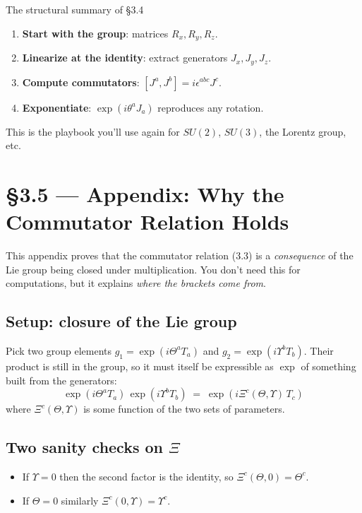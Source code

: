 \documentclass[11pt]{article}
\begin{document}
\begin{intuitionbox}{The structural summary of \S3.4}
\begin{enumerate}[leftmargin=1.5em, itemsep=2pt]
  \item \textbf{Start with the group}: matrices $R_x, R_y, R_z$.
  \item \textbf{Linearize at the identity}: extract generators $J_x, J_y, J_z$.
  \item \textbf{Compute commutators}: $[J^a, J^b] = i\epsilon^{abc}J^c$.
  \item \textbf{Exponentiate}: $\exp(i\theta^a J_a)$ reproduces any
    rotation.
\end{enumerate}
This is the playbook you'll use again for $SU(2)$, $SU(3)$, the Lorentz
group, etc.
\end{intuitionbox}

\section{\S3.5 --- Appendix: Why the Commutator Relation Holds}

This appendix proves that the commutator relation (3.3) is a
\emph{consequence} of the Lie group being closed under multiplication.
You don't need this for computations, but it explains \emph{where the
brackets come from}.

\subsection*{Setup: closure of the Lie group}

Pick two group elements $g_1 = \exp(i\Theta^a T_a)$ and $g_2 =
\exp(i\Upsilon^b T_b)$. Their product is still in the group, so it must
itself be expressible as $\exp$ of something built from the generators:
\begin{equation}
  \exp(i\Theta^a T_a)\, \exp(i\Upsilon^b T_b)
  \;=\;
  \exp(i\Xi^c(\Theta,\Upsilon)\, T_c)
  \tag{3.20}
\end{equation}
where $\Xi^c(\Theta, \Upsilon)$ is some function of the two sets of
parameters.

\subsection*{Two sanity checks on $\Xi$}

\begin{itemize}[leftmargin=1.5em, itemsep=2pt]
  \item If $\Upsilon = 0$ then the second factor is the identity, so
    $\Xi^c(\Theta, 0) = \Theta^c$.
  \item If $\Theta = 0$ similarly $\Xi^c(0, \Upsilon) = \Upsilon^c$.
\end{itemize}
\end{document}
